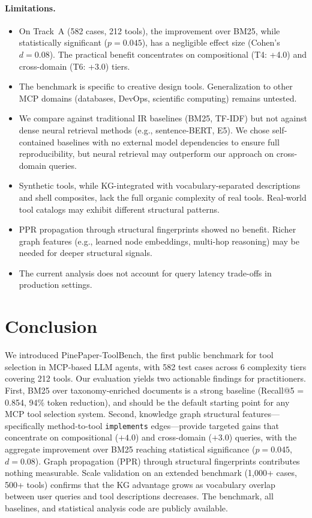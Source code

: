 \documentclass[11pt,a4paper]{article}
\begin{document}
\paragraph{Limitations.}
\begin{itemize}
  \item On Track~A (582 cases, 212 tools), the improvement over BM25, while statistically significant ($p=0.045$), has a negligible effect size (Cohen's $d=0.08$). The practical benefit concentrates on compositional (T4: +4.0) and cross-domain (T6: +3.0) tiers.
  \item The benchmark is specific to creative design tools. Generalization to other MCP domains (databases, DevOps, scientific computing) remains untested.
  \item We compare against traditional IR baselines (BM25, TF-IDF) but not against dense neural retrieval methods (e.g., sentence-BERT, E5). We chose self-contained baselines with no external model dependencies to ensure full reproducibility, but neural retrieval may outperform our approach on cross-domain queries.
  \item Synthetic tools, while KG-integrated with vocabulary-separated descriptions and shell composites, lack the full organic complexity of real tools. Real-world tool catalogs may exhibit different structural patterns.
  \item PPR propagation through structural fingerprints showed no benefit. Richer graph features (e.g., learned node embeddings, multi-hop reasoning) may be needed for deeper structural signals.
  \item The current analysis does not account for query latency trade-offs in production settings.
\end{itemize}

\section{Conclusion}
\label{sec:conclusion}

We introduced PinePaper-ToolBench, the first public benchmark for tool selection in MCP-based LLM agents, with 582 test cases across 6 complexity tiers covering 212 tools. Our evaluation yields two actionable findings for practitioners. First, BM25 over taxonomy-enriched documents is a strong baseline (Recall@5 = 0.854, 94\% token reduction), and should be the default starting point for any MCP tool selection system. Second, knowledge graph structural features---specifically method-to-tool \texttt{implements} edges---provide targeted gains that concentrate on compositional ($+4.0$) and cross-domain ($+3.0$) queries, with the aggregate improvement over BM25 reaching statistical significance ($p=0.045$, $d=0.08$). Graph propagation (PPR) through structural fingerprints contributes nothing measurable. Scale validation on an extended benchmark (1,000+ cases, 500+ tools) confirms that the KG advantage grows as vocabulary overlap between user queries and tool descriptions decreases. The benchmark, all baselines, and statistical analysis code are publicly available.
\end{document}
